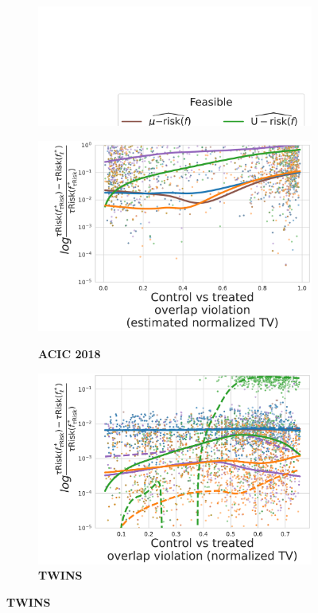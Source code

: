 \documentclass[a4paper,num-refs]{oup-contemporary}%
\begin{document}
\begin{figure}
\begin{subfigure}[b]{0.10\textwidth}
        \centering
        \includegraphics[width=1.5\textwidth]{legend_metrics.pdf}
    \end{subfigure}
    \begin{subfigure}[b]{0.44\textwidth}
        \centering
        \caption{\textbf{ACIC 2018}}
        \includegraphics[width=\textwidth]{norm_bias_trisk_tobest_acic2018_nuis_nlin_models_hgb.pdf}
        \label{fig:normalized_bias_tau_risk_to_best_method_acic_2018}
    \end{subfigure}
    \hfill
    \begin{subfigure}[b]{0.44\textwidth}
        \centering
        \caption{\textbf{TWINS}}
        \includegraphics[width=\textwidth]{norm_bias_trisk_tobest_twins_nuis_stack_models_hgb.pdf}

\end{subfigure}
\end{figure}
\end{document}
